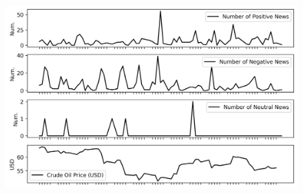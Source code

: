 \documentclass[12pt]{article}
\begin{document}
	\begin{figure}[H]
		\centering
		\small
		\includegraphics[width=\linewidth]{figures/case_studies/20190612_45d.png}
		\caption{}
	\end{figure}
\end{document}
